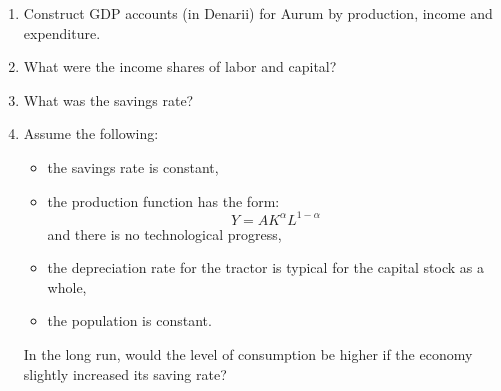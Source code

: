 \begin{enumerate}[label=(\alph*),leftmargin=2.2em,topsep=2pt,itemsep=1pt]
\item Construct GDP accounts (in Denarii) for Aurum by production, income and expenditure.
\item What were the income shares of labor and capital?
\item What was the savings rate?
\item Assume the following:
  \begin{itemize}[topsep=0pt,itemsep=0pt]
  \item the savings rate is constant,
  \item the production function has the form:
  \[
  Y=AK^\alpha L^{1-\alpha}
  \]
  and there is no technological progress,
  \item the depreciation rate for the tractor is typical for the capital stock as a whole,
  \item the population is constant.
  \end{itemize}
In the long run, would the level of consumption be higher if the economy slightly increased its saving rate?
\end{enumerate}
\resolespaco
